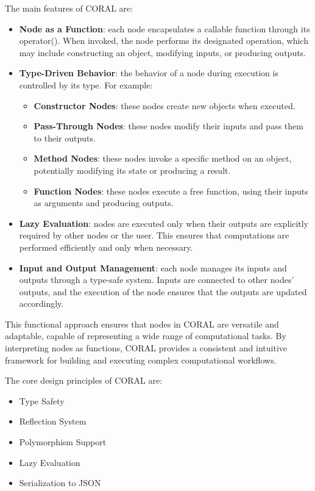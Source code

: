 \documentclass[a4paper,12pt]{article}
\begin{document}
The main features of CORAL are:
\begin{itemize}
  \item \textbf{Node as a Function}: each node encapsulates a callable function through its operator(). When invoked, the node performs its designated operation, which may include constructing an object, modifying inputs, or producing outputs.

  \item \textbf{Type-Driven Behavior}: the behavior of a node during execution is controlled by its type. For example:
  \begin{itemize}
    \item \textbf{Constructor Nodes}: these nodes create new objects when executed.
    \item \textbf{Pass-Through Nodes}: these nodes modify their inputs and pass them to their outputs.
    \item \textbf{Method Nodes}: these nodes invoke a specific method on an object, potentially modifying its state or producing a result.
    \item \textbf{Function Nodes}: these nodes execute a free function, using their inputs as arguments and producing outputs.
  \end{itemize}

  \item \textbf{Lazy Evaluation}: nodes are executed only when their outputs are explicitly required by other nodes or the user. This ensures that computations are performed efficiently and only when necessary.

  \item \textbf{Input and Output Management}: each node manages its inputs and outputs through a type-safe system. Inputs are connected to other nodes' outputs, and the execution of the node ensures that the outputs are updated accordingly.
\end{itemize}
This functional approach ensures that nodes in CORAL are versatile and adaptable, capable of representing a wide range of computational tasks. By interpreting nodes as functions, CORAL provides a consistent and intuitive framework for building and executing complex computational workflows.

The core design principles of CORAL are:
\begin{itemize}
  \item Type Safety
  \item Reflection System
  \item Polymorphism Support
  \item Lazy Evaluation
  \item Serialization to JSON
\end{itemize}
\end{document}
